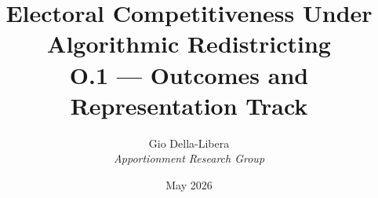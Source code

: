 \documentclass[12pt]{article}
\title{\textbf{Electoral Competitiveness Under Algorithmic Redistricting}\\[0.4em]
\large O.1 --- Outcomes and Representation Track}
\author{Gio Della-Libera \\ \textit{Apportionment Research Group}}
\date{May 2026}
\begin{document}
\maketitle
\begin{abstract}\end{abstract}






\end{document}
